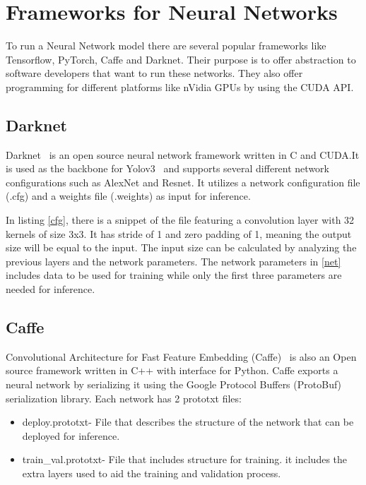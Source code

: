 
 \section{Frameworks for Neural Networks}
 \label{section:darknet}

To run a Neural Network model there are several popular frameworks like
Tensorflow, PyTorch, Caffe and Darknet.  Their purpose is to offer abstraction
to software developers that want to run these networks. They also offer
programming for different platforms like nVidia GPUs by using the CUDA API.

\subsection{Darknet}

Darknet~\cite{darknet} is an open source neural network framework written in C
and CUDA.It is used as the backbone for Yolov3~\cite{yolov3} and supports
several different network configurations such as AlexNet and Resnet.  It
utilizes a network configuration file (.cfg) and a weights file (.weights) as
input for inference.



In listing \ref{cfg}, there is a snippet of the file featuring a convolution
layer with 32 kernels of size 3x3. It has stride of 1 and zero padding of 1,
meaning the output size will be equal to the input. The input size can be
calculated by analyzing the previous layers and the network parameters. The
network parameters in \ref{net} includes data to be used for training while only
the first three parameters are needed for inference.




\subsection{Caffe}

Convolutional Architecture for Fast Feature Embedding (Caffe)~\cite{caffe} is
also an Open source framework written in C++ with interface for Python.  Caffe
exports a neural network by serializing it using the Google Protocol Buffers
(ProtoBuf) serialization library. Each network has 2 prototxt files:
\begin{itemize}
    \item deploy.prototxt- File that describes the structure of the network that
      can be deployed for inference.
    \item train\_val.prototxt- File that includes structure for training.  it
      includes the extra layers used to aid the training and validation process.
\end{itemize}

